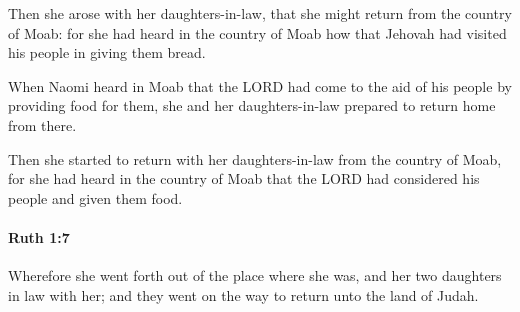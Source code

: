 			\begin{versebox}
					\item[BHS] 
					\item[LXX] 
					\item[ASV] Then she arose with her daughters-in-law, that she might return from the country of Moab: for she had heard in the country of Moab how that Jehovah had visited his people in giving them bread.
					\item[NIV] When Naomi heard in Moab that the LORD had come to the aid of his people by providing food for them, she and her daughters-in-law prepared to return home from there.
					\item[NRSV] Then she started to return with her daughters-in-law from the country of Moab, for she had heard in the country of Moab that the LORD had considered his people and given them food.
			\end{versebox}

		\paragraph{Ruth 1:7} %
			\label{RUTH-1-7}

			Wherefore she went forth out of the place where she was, and her two daughters in law with her; and they went on the way to return unto the land of Judah.

